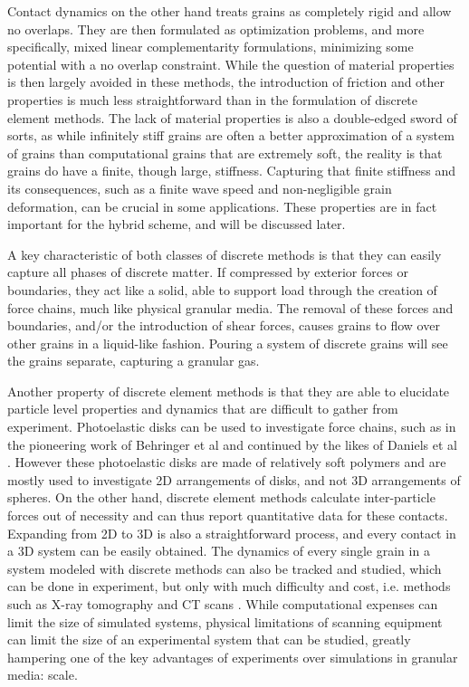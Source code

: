 Contact dynamics on the other hand treats grains as completely rigid and allow no overlaps. They are then formulated as optimization problems, and more specifically, mixed linear complementarity formulations, minimizing some potential with a no overlap constraint. While the question of material properties is then largely avoided in these methods, the introduction of friction and other properties is much less straightforward than in the formulation of discrete element methods. The lack of material properties is also a double-edged sword of sorts, as while infinitely stiff grains are often a better approximation of a system of grains than computational grains that are extremely soft, the reality is that grains do have a finite, though large, stiffness. Capturing that finite stiffness and its consequences, such as a finite wave speed and non-negligible grain deformation, can be crucial in some applications. These properties are in fact important for the hybrid scheme, and will be discussed later.

A key characteristic of both classes of discrete methods is that they can easily capture all phases of discrete matter. If compressed by exterior forces or boundaries, they act like a solid, able to support load through the creation of force chains, much like physical granular media. The removal of these forces and boundaries, and/or the introduction of shear forces, causes grains to flow over other grains in a liquid-like fashion. Pouring a system of discrete grains will see the grains separate, capturing a granular gas.

Another property of discrete element methods is that they are able to elucidate particle level properties and dynamics that are difficult to gather from experiment. Photoelastic disks can be used to investigate force chains, such as in the pioneering work of Behringer et al and continued by the likes of Daniels et al \cite{Daniels:2017,Howell:1999}. However these photoelastic disks are made of relatively soft polymers and are mostly used to investigate 2D arrangements of disks, and not 3D arrangements of spheres. On the other hand, discrete element methods calculate inter-particle forces out of necessity and can thus report quantitative data for these contacts. Expanding from 2D to 3D is also a straightforward process, and every contact in a 3D system can be easily obtained. The dynamics of every single grain in a system modeled with discrete methods can also be tracked and studied, which can be done in experiment, but only with much difficulty and cost, i.e. methods such as X-ray tomography and CT scans \cite{Kim:2013}. While computational expenses can limit the size of simulated systems, physical limitations of scanning equipment can limit the size of an experimental system that can be studied, greatly hampering one of the key advantages of experiments over simulations in granular media: scale. 

